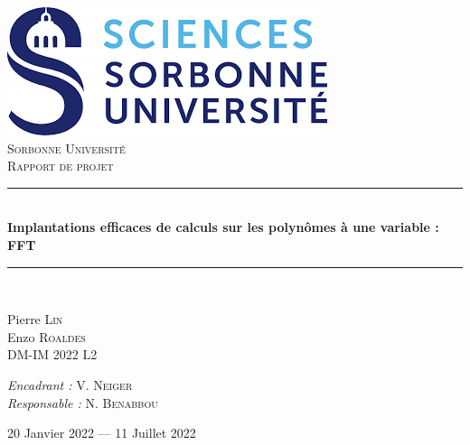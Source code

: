 \documentclass[12pt, a4paper]{article}
\newcommand{\HRule}{\rule{\linewidth}{0.5mm}}
\begin{document}
\begin{titlepage}
  \begin{sffamily}
  \begin{center}

    \includegraphics[scale=0.4]{logo.png}~\\[1.5cm]

    \textsc{\LARGE Sorbonne Université}\\[2cm]

    \textsc{\Large Rapport de projet}\\[1.5cm]

    \HRule \\[0.4cm]
    { \huge \bfseries Implantations efficaces de calculs sur les polynômes à une variable : FFT\\[0.4cm] }

    \HRule \\[4cm]


    \begin{minipage}{0.4\textwidth}
      \begin{flushleft} \large
        Pierre \textsc{Lin}\\
        Enzo \textsc{Roaldes}\\
        DM-IM 2022 L2\\
      \end{flushleft}
    \end{minipage}
    \begin{minipage}{0.4\textwidth}
      \begin{flushright} \large
        \emph{Encadrant :} V. \textsc{Neiger}\\
        \emph{Responsable :} N. \textsc{Benabbou}\\
      \end{flushright}
    \end{minipage}

    \vfill

    {\large 20 Janvier 2022 — 11 Juillet 2022}

  \end{center}
  \end{sffamily}
\end{titlepage}
\end{document}
